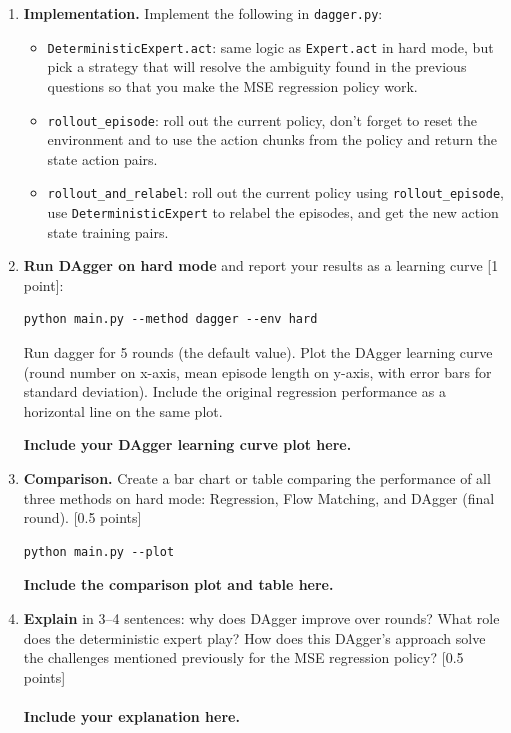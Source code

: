 \documentclass[12pt]{article}
\begin{document}
\begin{enumerate}

\item \textbf{Implementation.} Implement the following in \texttt{dagger.py}:

\begin{itemize}
    \item \texttt{DeterministicExpert.act}: same logic as \texttt{Expert.act} in hard mode, but pick a strategy that will resolve the ambiguity found in the previous questions so that you make the MSE regression policy work.
    \item \texttt{rollout\_episode}: roll out the current policy, don't forget to reset the environment and to use the action chunks from the policy and return the state action pairs.
    \item \texttt{rollout\_and\_relabel}: roll out the current policy using \texttt{rollout\_episode}, use \texttt{DeterministicExpert} to relabel the episodes, and get the new action state training pairs.
\end{itemize}

\item \textbf{Run DAgger on hard mode} and report your results as a learning curve [1 point]:

\begin{tcolorbox}[width=\linewidth, sharp corners=all, colback=white!95!black]
\begin{verbatim}
python main.py --method dagger --env hard
\end{verbatim}
\end{tcolorbox}

\noindent Run dagger for 5 rounds (the default value). Plot the DAgger learning curve (round number on x-axis, mean episode length on y-axis, with error bars for standard deviation). Include the original regression performance as a horizontal line on the same plot.

\textbf{\color{red}Include your DAgger learning curve plot here.}

\item \textbf{Comparison.} Create a bar chart or table comparing the performance of all three methods on hard mode: Regression, Flow Matching, and DAgger (final round).  [0.5 points]\\

\begin{tcolorbox}[width=\linewidth, sharp corners=all, colback=white!95!black]
\begin{verbatim}
python main.py --plot
\end{verbatim}
\end{tcolorbox}

\textbf{\color{red}Include the comparison plot and table here.}


\item \textbf{Explain} in 3--4 sentences: why does DAgger improve over rounds? What role does the deterministic expert play? How does this DAgger's approach solve the challenges mentioned previously for the MSE regression policy? [0.5 points]\\
\\
\textbf{\color{red}Include your explanation here.}

\end{enumerate}
\end{document}
